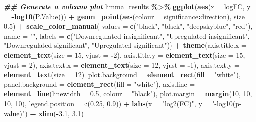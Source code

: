 \documentclass[9pt,a4paper,]{extarticle}
\newenvironment{Shaded}{\begin{snugshade}}{\end{snugshade}}
\newcommand{\AttributeTok}[1]{\textcolor[rgb]{0.13,0.29,0.53}{#1}}
\newcommand{\DecValTok}[1]{\textcolor[rgb]{0.00,0.00,0.81}{#1}}
\newcommand{\DocumentationTok}[1]{\textcolor[rgb]{0.56,0.35,0.01}{\textbf{\textit{#1}}}}
\newcommand{\FloatTok}[1]{\textcolor[rgb]{0.00,0.00,0.81}{#1}}
\newcommand{\FunctionTok}[1]{\textcolor[rgb]{0.13,0.29,0.53}{\textbf{#1}}}
\newcommand{\NormalTok}[1]{#1}
\newcommand{\SpecialCharTok}[1]{\textcolor[rgb]{0.81,0.36,0.00}{\textbf{#1}}}
\newcommand{\StringTok}[1]{\textcolor[rgb]{0.31,0.60,0.02}{#1}}
\begin{document}
\begin{Shaded}
\begin{Highlighting}[]
\DocumentationTok{\#\# Generate a volcano plot}
\NormalTok{limma\_results }\SpecialCharTok{\%\textgreater{}\%}
  \FunctionTok{ggplot}\NormalTok{(}\FunctionTok{aes}\NormalTok{(}\AttributeTok{x =}\NormalTok{ logFC, }\AttributeTok{y =} \SpecialCharTok{{-}}\FunctionTok{log10}\NormalTok{(P.Value))) }\SpecialCharTok{+}
  \FunctionTok{geom\_point}\NormalTok{(}\FunctionTok{aes}\NormalTok{(}\AttributeTok{colour =}\NormalTok{ significance}\SpecialCharTok{:}\NormalTok{direction), }\AttributeTok{size =} \FloatTok{0.5}\NormalTok{) }\SpecialCharTok{+}
  \FunctionTok{scale\_color\_manual}\NormalTok{(}
    \AttributeTok{values =} \FunctionTok{c}\NormalTok{(}\StringTok{"black"}\NormalTok{, }\StringTok{"black"}\NormalTok{, }\StringTok{"deepskyblue"}\NormalTok{, }\StringTok{"red"}\NormalTok{), }\AttributeTok{name =} \StringTok{""}\NormalTok{,}
    \AttributeTok{labels =} \FunctionTok{c}\NormalTok{(}\StringTok{"Downregulated insignificant"}\NormalTok{,}
               \StringTok{"Upregulated insignificant"}\NormalTok{,}
               \StringTok{"Downregulated significant"}\NormalTok{,}
               \StringTok{"Upregulated significant"}\NormalTok{)) }\SpecialCharTok{+}
  \FunctionTok{theme}\NormalTok{(}\AttributeTok{axis.title.x =} \FunctionTok{element\_text}\NormalTok{(}\AttributeTok{size =} \DecValTok{15}\NormalTok{, }\AttributeTok{vjust =} \SpecialCharTok{{-}}\DecValTok{2}\NormalTok{),}
        \AttributeTok{axis.title.y =} \FunctionTok{element\_text}\NormalTok{(}\AttributeTok{size =} \DecValTok{15}\NormalTok{, }\AttributeTok{vjust =} \DecValTok{2}\NormalTok{),}
        \AttributeTok{axis.text.x =} \FunctionTok{element\_text}\NormalTok{(}\AttributeTok{size =} \DecValTok{12}\NormalTok{, }\AttributeTok{vjust =} \SpecialCharTok{{-}}\DecValTok{1}\NormalTok{),}
        \AttributeTok{axis.text.y =} \FunctionTok{element\_text}\NormalTok{(}\AttributeTok{size =} \DecValTok{12}\NormalTok{),}
        \AttributeTok{plot.background =} \FunctionTok{element\_rect}\NormalTok{(}\AttributeTok{fill =} \StringTok{"white"}\NormalTok{),}
        \AttributeTok{panel.background =} \FunctionTok{element\_rect}\NormalTok{(}\AttributeTok{fill =} \StringTok{"white"}\NormalTok{),}
        \AttributeTok{axis.line =} \FunctionTok{element\_line}\NormalTok{(}\AttributeTok{linewidth =} \FloatTok{0.5}\NormalTok{, }\AttributeTok{colour =} \StringTok{"black"}\NormalTok{),}
        \AttributeTok{plot.margin =} \FunctionTok{margin}\NormalTok{(}\DecValTok{10}\NormalTok{, }\DecValTok{10}\NormalTok{, }\DecValTok{10}\NormalTok{, }\DecValTok{10}\NormalTok{),}
        \AttributeTok{legend.position =} \FunctionTok{c}\NormalTok{(}\FloatTok{0.25}\NormalTok{, }\FloatTok{0.9}\NormalTok{)) }\SpecialCharTok{+}
  \FunctionTok{labs}\NormalTok{(}\AttributeTok{x =} \StringTok{"log2(FC)"}\NormalTok{, }\AttributeTok{y =} \StringTok{"{-}log10(p{-}value)"}\NormalTok{) }\SpecialCharTok{+}
  \FunctionTok{xlim}\NormalTok{(}\SpecialCharTok{{-}}\FloatTok{3.1}\NormalTok{, }\FloatTok{3.1}\NormalTok{)}
\end{Highlighting}
\end{Shaded}
\end{document}
